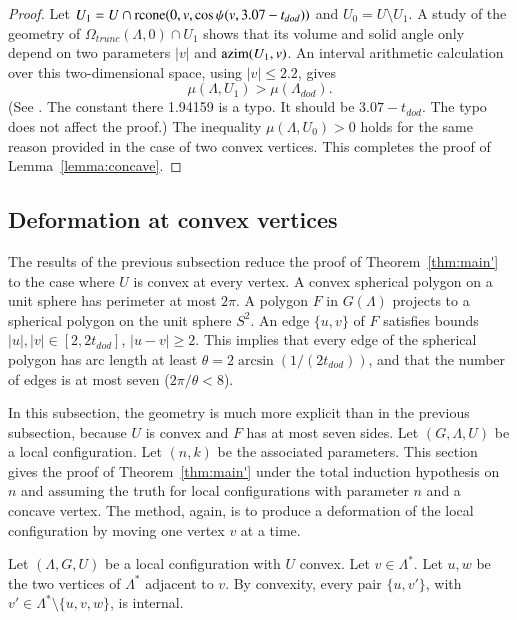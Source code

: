 \documentclass{article} %
\begin{document}
\begin{proof}
Let $U_1 = U\cap {\operatorname{rcone}}(0,v,\cos\psi(v,3.07-t_{dod}))$ and $U_0 = U
\setminus U_1$.  A study of the geometry of $\Omega_{trunc}(\Lambda,0)
\cap U_1$ shows that its volume and solid angle only depend 
on two parameters $|v|$ and
${\operatorname{azim}}(U_1,v)$.  An interval arithmetic calculation over this
two-dimensional space, using $|v|\le 2.2$, gives
$$
\mu(\Lambda,U_1) > \mu(\Lambda_{dod}).
$$
(See \cite[\S7.2.6]{Hales:2002:Dodec}. The constant there 1.94159 is a typo.
It should be $3.07-t_{dod}$.  The typo does not affect the proof.)
The inequality $\mu(\Lambda,U_0)>0$ holds for the same reason provided
in the case of two convex vertices.  This completes
the proof of Lemma~\ref{lemma:concave}.

\end{proof}

\subsection{Deformation at convex vertices}

The results of the previous subsection
reduce the proof of Theorem~\ref{thm:main'} to
the case where $U$ is convex at every vertex.  A convex
spherical polygon on a unit sphere has perimeter
at most $2\pi$.  A polygon $F$ in $G(\Lambda)$ projects to
a spherical polygon on the unit sphere $S^2$.  An edge $\{u,v\}$ of
$F$ satisfies bounds $|u|,|v|\in[2,2t_{dod}]$, $|u-v|\ge 2$. This
implies that every edge of the spherical polygon has arc length
at least $\theta=2\arcsin(1/(2t_{dod}))$, and that the number
of edges is at most seven ($2\pi/\theta < 8$).

In this subsection, the geometry is much more explicit than in the
previous subsection, because $U$ is convex and $F$ has at most seven sides.
Let $(G,\Lambda,U)$ be a local configuration.
Let $(n,k)$ be the associated parameters.
This section gives the proof of Theorem~\ref{thm:main'} under 
the total induction hypothesis on $n$ and assuming the truth
for local configurations with parameter $n$ and a concave vertex.
The method, again, is to produce a deformation of the local
configuration by moving one vertex $v$ at a time.



Let $(\Lambda,G,U)$ be a local configuration with $U$ convex.
Let $v\in\Lambda^*$.  
Let $u,w$ be the two vertices of $\Lambda^*$
adjacent to $v$.  By convexity, every pair $\{u,v'\}$,
with $v'\in\Lambda^*\setminus\{u,v,w\}$, is internal.
\end{document}
